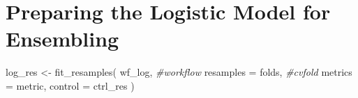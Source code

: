 \documentclass[
]{article}
\newenvironment{Shaded}{\begin{snugshade}}{\end{snugshade}}
\newcommand{\AttributeTok}[1]{\textcolor[rgb]{0.77,0.63,0.00}{#1}}
\newcommand{\CommentTok}[1]{\textcolor[rgb]{0.56,0.35,0.01}{\textit{#1}}}
\newcommand{\FunctionTok}[1]{\textcolor[rgb]{0.00,0.00,0.00}{#1}}
\newcommand{\NormalTok}[1]{#1}
\newcommand{\OtherTok}[1]{\textcolor[rgb]{0.56,0.35,0.01}{#1}}
\begin{document}
\hypertarget{preparing-the-logistic-model-for-ensembling}{%
\section{Preparing the Logistic Model for
Ensembling}\label{preparing-the-logistic-model-for-ensembling}}

\begin{Shaded}
\begin{Highlighting}[]
\NormalTok{log\_res }\OtherTok{\textless{}{-}} 
  \FunctionTok{fit\_resamples}\NormalTok{(}
\NormalTok{    wf\_log, }\CommentTok{\#workflow}
    \AttributeTok{resamples =}\NormalTok{ folds, }\CommentTok{\#cvfold}
    \AttributeTok{metrics =}\NormalTok{ metric,}
    \AttributeTok{control =}\NormalTok{ ctrl\_res}
\NormalTok{  )}
\end{Highlighting}
\end{Shaded}
\end{document}
